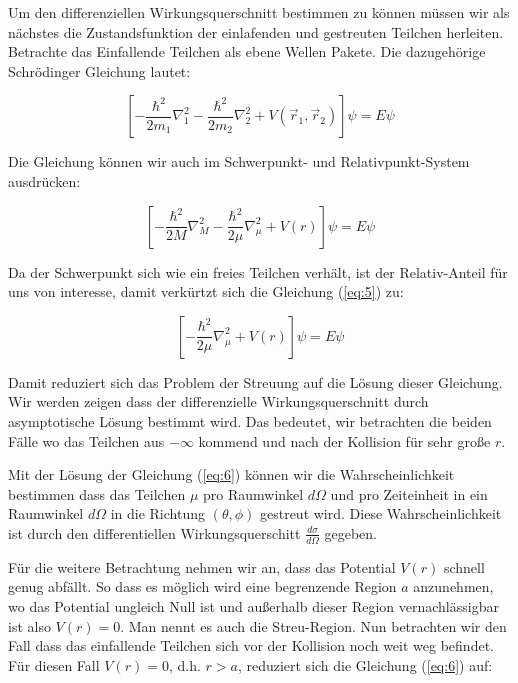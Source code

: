 Um den differenziellen Wirkungsquerschnitt bestimmen zu können müssen wir als nächstes die Zustandsfunktion der einlafenden und  gestreuten Teilchen herleiten. Betrachte das Einfallende Teilchen als ebene Wellen Pakete. Die dazugehörige Schrödinger Gleichung lautet:

\begin{equation}
  \label{eq:4}
  \left[ - \frac{\hbar^2}{2m_1}\nabla_1^2 - \frac{\hbar^2}{2m_2}\nabla_2^2 +   V(\vec r_1,\vec r_2)\right]\psi = E\psi
\end{equation}

Die Gleichung können wir auch im Schwerpunkt- und Relativpunkt-System ausdrücken:

\begin{equation}
  \label{eq:5}
  \left[ - \frac{\hbar^2}{2M}\nabla_M^2 - \frac{\hbar^2}{2\mu}\nabla_\mu^2 +   V(r)\right]\psi = E\psi
\end{equation}

Da der Schwerpunkt sich wie ein freies Teilchen verhält, ist der Relativ-Anteil für uns von interesse, damit verkürtzt sich die Gleichung (\ref{eq:5}) zu:

\begin{equation}
  \label{eq:6}
  \left[- \frac{\hbar^2}{2\mu}\nabla_\mu^2 +   V(r)\right]\psi = E\psi
\end{equation}


Damit reduziert sich das Problem der Streuung auf die Lösung dieser Gleichung. Wir werden zeigen dass der differenzielle Wirkungsquerschnitt durch asymptotische Lösung bestimmt wird. Das bedeutet, wir betrachten die beiden Fälle wo das Teilchen aus \(-\infty\) kommend und nach der Kollision für sehr große \(r\).


Mit der Lösung der Gleichung (\ref{eq:6}) können wir die Wahrscheinlichkeit bestimmen  dass das Teilchen \(\mu\)  pro Raumwinkel \(d\Omega\) und pro Zeiteinheit in ein Raumwinkel \(d\Omega\) in die Richtung \((\theta,\phi)\) gestreut wird. Diese Wahrscheinlichkeit ist durch den differentiellen Wirkungsquerschitt \(\frac{d\sigma}{d\Omega}\) gegeben.

Für die weitere Betrachtung nehmen wir an, dass das Potential \(V(r)\) schnell genug abfällt. So dass es möglich wird eine begrenzende Region \(a\) anzunehmen, wo das Potential ungleich Null ist und außerhalb dieser Region vernachlässigbar ist also \(V(r)=0\). Man nennt es auch die Streu-Region. Nun betrachten wir den Fall dass das einfallende Teilchen sich vor der Kollision noch weit weg befindet. Für diesen Fall \(V(r)=0\), d.h. \(r > a \), reduziert sich die Gleichung (\ref{eq:6}) auf:

